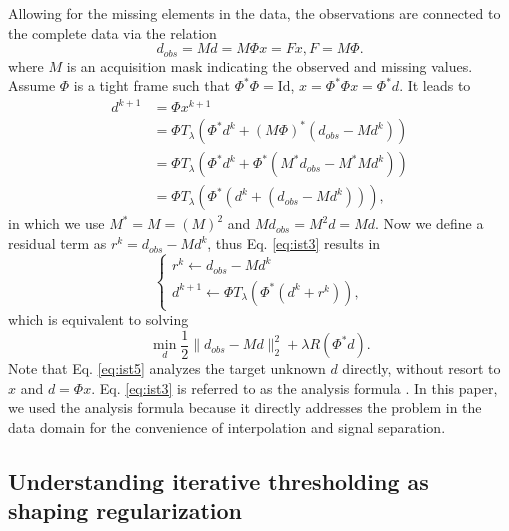 Allowing for the missing elements in the data, the observations are connected to the complete data via the relation
\begin{equation}
 d_{obs}=Md=M\Phi x=Fx, F=M\Phi.
 \end{equation}
where $M$ is an acquisition mask indicating the observed and missing values. Assume $\Phi$ is a tight frame such that $\Phi^*\Phi=\mathrm{Id}$, $x=\Phi^*\Phi x=\Phi^*d$. It leads to
\begin{equation}\label{eq:ist3}
  \begin{array}{ll}
    d^{k+1} & =\Phi x^{k+1} \\
      & =\Phi T_{\lambda}(\Phi^*d^{k}+(M\Phi)^*(d_{obs}-Md^{k})) \\
      & =\Phi T_{\lambda}(\Phi^*d^{k}+\Phi^*(M^*d_{obs}-M^*Md^{k})) \\
      & =\Phi T_{\lambda}(\Phi^*(d^{k}+(d_{obs}-Md^{k}))),
  \end{array}
\end{equation}
in which we use $M^*=M=(M)^2$ and $Md_{obs}=M^2d=Md$. Now we define a residual term as $r^{k}=d_{obs}-Md^{k}$, thus Eq. \eqref{eq:ist3} results in
\begin{equation}\label{eq:ist4}
  \left\{
  \begin{array}{l}
    r^{k}\leftarrow d_{obs}-Md^{k} \\
    d^{k+1}\leftarrow \Phi T_{\lambda}(\Phi^*(d^{k}+r^{k})),
  \end{array}
  \right.
\end{equation}
which is equivalent to solving
\begin{equation}\label{eq:ist5}
  \min\limits_{d}\frac{1}{2}\|d_{obs}-Md\|_2^2+\lambda R(\Phi^{*}d).
\end{equation}
Note that Eq. \eqref{eq:ist5} analyzes the target unknown $d$ directly, without resort to $x$ and $d=\Phi x$. Eq. \eqref{eq:ist3} is referred to as the analysis formula \citep{elad2007analysis}. In this paper, we used the analysis formula because it directly addresses the problem in the data domain for the convenience of interpolation and signal separation.


\subsection{Understanding iterative thresholding as shaping regularization}

